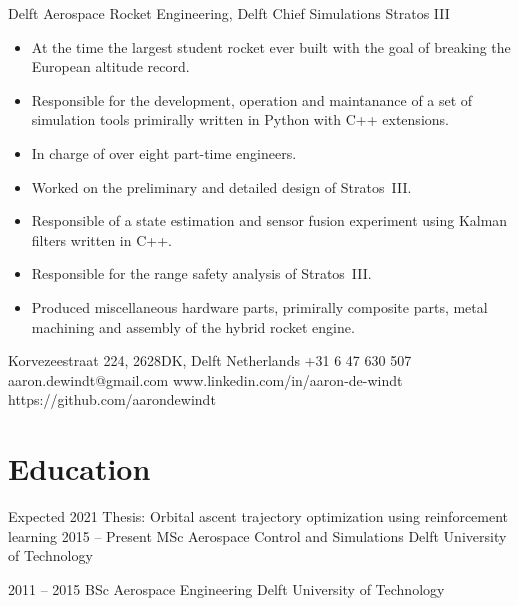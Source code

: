 \documentclass{tccv}
\begin{document}
\begin{eventlist}
     {Delft Aerospace Rocket Engineering, Delft}
     {Chief Simulations Stratos III}
\begin{itemize}
    \item{At the time the largest student rocket ever built with the goal of breaking the European altitude record.}
    \item{Responsible for the development, operation and maintanance of a set of simulation tools primirally written in Python with C++ extensions.}
    \item{In charge of over eight part-time engineers.}
    \item{Worked on the preliminary and detailed design of \linebreak Stratos~III.}
    \item{Responsible of a state estimation and sensor fusion experiment using Kalman filters written in C++.}
    \item{Responsible for the range safety analysis of Stratos~III.}
    \item{Produced miscellaneous hardware parts, primirally \linebreak composite parts, metal machining and assembly of the hybrid rocket engine.}
\end{itemize}

\end{eventlist}

\personal
    {Korvezeestraat 224, 2628DK, Delft \newline Netherlands }
    {+31 6 47 630 507}
    {aaron.dewindt@gmail.com}
    {www.linkedin.com/in/aaron-de-windt}
    {https://github.com/aarondewindt}


\section{Education}

\begin{yearlist}

\item[Expected 2021 \hspace*{\fill} \linebreak Thesis: Orbital ascent trajectory optimization using reinforcement learning]
    {2015 -- Present}
    {MSc Aerospace Control and Simulations}
    {Delft University of Technology}

\item{2011 -- 2015}
    {BSc Aerospace Engineering}
    {Delft University of Technology}

\end{yearlist}
\end{document}
